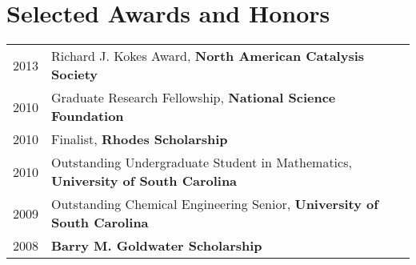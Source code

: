 \documentclass[a4paper,10pt]{article}
\begin{document}
\section{Selected Awards and Honors}
\begin{tabular}{ll}
2013 & Richard J. Kokes Award, \textbf{North American Catalysis Society} \\
2010 & Graduate Research Fellowship, \textbf{National Science Foundation} \\
2010 & Finalist, \textbf{Rhodes Scholarship} \\
2010 & Outstanding Undergraduate Student in Mathematics, \textbf{University of South Carolina} \\
2009 & Outstanding Chemical Engineering Senior, \textbf{University of South Carolina} \\
2008 & \textbf{Barry M. Goldwater Scholarship} \\
\end{tabular}

\begin{refsection}
\nocite{Montoya2018,Singh2018,Singh2017,Dagdelen2017,Mathew2017,C7CP02855E,Montoya2017a,Montoya2017,Latimer2016,Seitz2016,Sandberg2016,Tsai2016,Wang2015,Bertheussen2016,Doyle2015,Montoya2015,Montoya2015a,Schaal2007,Montoya2014,Hansen2013,Montoya2013}
%
\printbibliography
\end{refsection}
\end{document}
